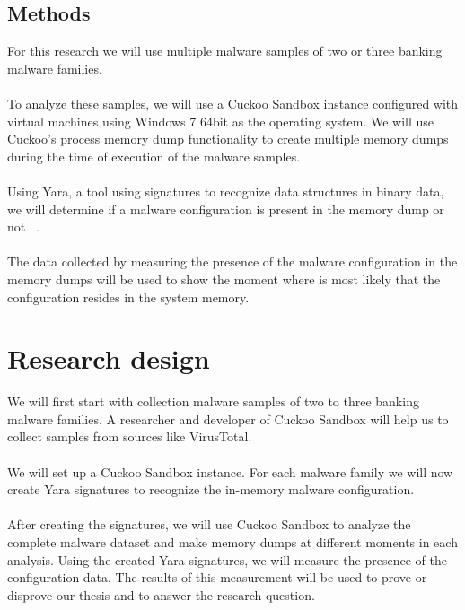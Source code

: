 \documentclass[conference]{IEEEtran}
\begin{document}
\subsection{Methods}

For this research we will use multiple malware samples of two or three banking malware families.\\\\
To analyze these samples, we will use a Cuckoo Sandbox instance configured with virtual machines using Windows 7 64bit as the operating system.  We will use Cuckoo’s process memory dump functionality to create multiple memory dumps during the time of execution of the malware samples.\\\\
Using Yara, a tool using signatures to recognize data structures in binary  data, we will determine if a malware configuration is present in the memory dump or not ~\cite{robertsonmemforen}.\\\\
The data collected by measuring the presence of the malware configuration in the memory dumps will be used to show the moment where is most likely that the configuration resides in the system memory.

\newpage
\newpage
\section{Research design}
We will first start with collection malware samples of two to three banking malware families. A researcher and developer of Cuckoo Sandbox will help us to collect samples from sources like VirusTotal.\\\\
We will set up a Cuckoo Sandbox instance. For each malware family we will now create Yara signatures to recognize the in-memory malware configuration.\\\\
After creating the signatures, we will use Cuckoo Sandbox to analyze the complete malware dataset and make memory dumps at different moments in each analysis. Using the created Yara signatures, we will measure the presence of the configuration data. The results of this measurement will be used to prove or disprove our thesis and to answer the research question.



\end{document}
